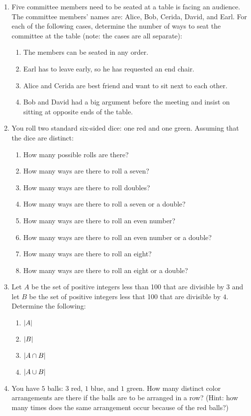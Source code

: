\documentclass[letterpaper,12pt,fleqn]{article}
\begin{document}
\begin{enumerate}[left=0in,itemsep=0.5in]
\item Five committee members need to be seated at a table is facing an audience.  The committee members' names
  are: Alice, Bob, Cerida, David, and Earl.  For each of the following cases, determine the number of ways to
  seat the committee at the table (note: the cases are all separate):
  \begin{enumerate}
  \item The members can be seated in any order.
  \item Earl has to leave early, so he has requested an end chair.
  \item Alice and Cerida are best friend and want to sit next to each other.
  \item Bob and David had a big argument before the meeting and insist on sitting at opposite ends of the table.
  \end{enumerate}

\item You roll two standard six-sided dice: one red and one green.  Assuming that the dice are distinct:
  \begin{enumerate}
  \item How many possible rolls are there?
  \item How many ways are there to roll a seven?
  \item How many ways are there to roll doubles?
  \item How many ways are there to roll a seven or a double?
  \item How many ways are there to roll an even number?
  \item How many ways are there to roll an even number or a double?
  \item How many ways are there to roll an eight?
  \item How many ways are there to roll an eight or a double?
  \end{enumerate}

\item Let \(A\) be the set of positive integers less than 100 that are divisible by \(3\) and let \(B\) be the set of
  positive integers less that 100 that are divisible by \(4\).  Determine the following:
  \begin{enumerate}
  \item \(\lvert A\rvert\)
  \item \(\lvert B\rvert\)
  \item \(\lvert A\cap B\rvert\)
  \item \(\lvert A\cup B\rvert\)
  \end{enumerate}

\item You have \(5\) balls: \(3\) red, \(1\) blue, and \(1\) green.  How many distinct color arrangements are there
  if the balls are to be arranged in a row? (Hint: how many times does the same arrangement occur because of the
  red balls?)

\end{enumerate}
\end{document}
